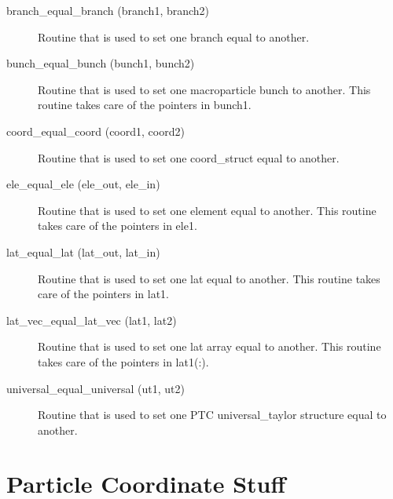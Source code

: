 \begin{description}

\label{r:branch.equal.branch}
\item[branch_equal_branch (branch1, branch2)] \Newline 
Routine that is used to set one branch equal to another. 

\label{r:bunch.equal.bunch}
\item[bunch_equal_bunch (bunch1, bunch2)] \Newline
Routine that is used to set one macroparticle bunch to another. This routine
takes care of the pointers in bunch1.

\label{r:coord.equal.coord}
\item[coord_equal_coord (coord1, coord2)] \Newline
Routine that is used to set one coord_struct equal to another. 

\label{r:ele.equal.ele}
\item[ele_equal_ele (ele_out, ele_in)] \Newline
Routine that is used to set one element equal to another. 
This routine takes care of the pointers in ele1. 

\label{r:lat.equal.lat}
\item[lat_equal_lat (lat_out, lat_in)] \Newline
Routine that is used to set one lat equal to another. 
This routine takes care of the pointers in lat1. 

\label{r:lat.vec.equal.lat.vec}
\item[lat_vec_equal_lat_vec (lat1, lat2)] \Newline
Routine that is used to set one lat array equal to another. 
This routine takes care of the pointers in lat1(:). 

\label{r:universal.equal.universal}
\item[universal_equal_universal (ut1, ut2)] \Newline
Routine that is used to set one PTC universal_taylor 
structure equal to another. 

\end{description}

\section{Particle Coordinate Stuff}
\label{r:coord}    

